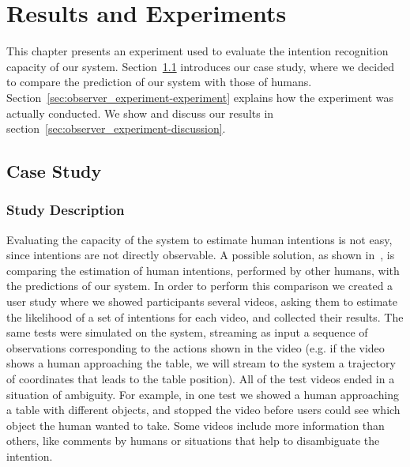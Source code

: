 \chapter{Results and Experiments} %

\label{chapter:observer_results} %


This chapter presents an experiment used to evaluate the intention recognition capacity of our system. Section~\ref{sec:observer_experiment-case_study} introduces our case study, where we decided to compare the prediction of our system with those of humans. Section~\ref{sec:observer_experiment-experiment} explains how the experiment was actually conducted. We show and discuss our results in section~\ref{sec:observer_experiment-discussion}.


\section{Case Study}
\label{sec:observer_experiment-case_study}
\subsection{Study Description}

Evaluating the capacity of the system to estimate human intentions is not easy, since intentions are not directly observable. A possible solution, as shown in~\cite{baker2014modeling}, is comparing the estimation of human intentions, performed by other humans, with the predictions of our system. In order to perform this comparison we created a user study where we showed participants several videos, asking them to estimate the likelihood of a set of intentions  for each video, and collected their results. The same tests were simulated on the system, streaming as input a sequence of observations  corresponding to the actions shown in the video (e.g. if the video shows a human approaching the table, we will stream to the system a trajectory of coordinates that leads to the table position). All of the test videos ended in a situation of ambiguity. For example, in one test we showed a human approaching a table with different objects, and stopped the video before users could see which object the human wanted to take. Some videos include more information than others, like comments by humans or situations that help to disambiguate the intention. 

